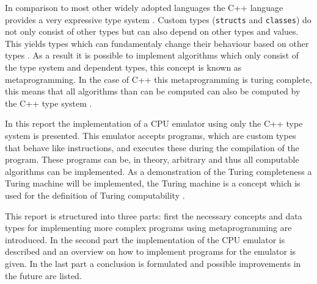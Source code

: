 

In comparison to most other widely adopted languages the C++ language provides a very expressive type system \cite{concepts05}. Custom
types (\lstinline{structs} and \lstinline{classes}) do not only consist of other types but can also depend on other
types and values. This yields types which can fundamentaly change their behaviour based on other types \cite[Chapter~13.3]{std}. As a result
it is possible to implement algorithms which only consist of the type system and dependent types, this concept is known
as metaprogramming. In the case of C++ this metaprogramming is turing complete, this means that all algorithms than
can be computed can also be computed by the C++ type system \cite{TuringComputability}.

In this report the implementation of a CPU emulator using only the C++ type system is presented. This emulator
accepts programs, which are custom types that behave like instructions, and executes these during the compilation of
the program. These programs can be, in theory, arbitrary and thus all computable algorithms can be implemented. As a
demonstration of the Turing completeness a Turing machine will be implemented, the Turing machine is a concept which
is used for the definition of Turing computability \cite{Turing1936}.

This report is structured into three parts: first the necessary concepts and data types for implementing more complex 
programs using metaprogramming are introduced. In the second part the implementation of the CPU emulator is described
and an overview on how to implement programs for the emulator is given. In the last part a conclusion is formulated and
possible improvements in the future are listed.
